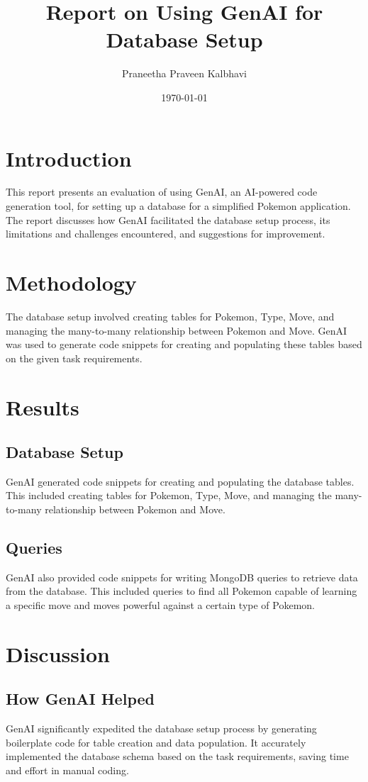\documentclass{article}
\title{Report on Using GenAI for Database Setup}
\author{Praneetha Praveen Kalbhavi}
\date{\today}
\begin{document}
\maketitle

\section{Introduction}
This report presents an evaluation of using GenAI, an AI-powered code generation tool, for setting up a database for a simplified Pokemon application. The report discusses how GenAI facilitated the database setup process, its limitations and challenges encountered, and suggestions for improvement.

\section{Methodology}
The database setup involved creating tables for Pokemon, Type, Move, and managing the many-to-many relationship between Pokemon and Move. GenAI was used to generate code snippets for creating and populating these tables based on the given task requirements.

\section{Results}
\subsection{Database Setup}
GenAI generated code snippets for creating and populating the database tables. This included creating tables for Pokemon, Type, Move, and managing the many-to-many relationship between Pokemon and Move.

\subsection{Queries}
GenAI also provided code snippets for writing MongoDB queries to retrieve data from the database. This included queries to find all Pokemon capable of learning a specific move and moves powerful against a certain type of Pokemon.

\section{Discussion}
\subsection{How GenAI Helped}
GenAI significantly expedited the database setup process by generating boilerplate code for table creation and data population. It accurately implemented the database schema based on the task requirements, saving time and effort in manual coding.
\end{document}
